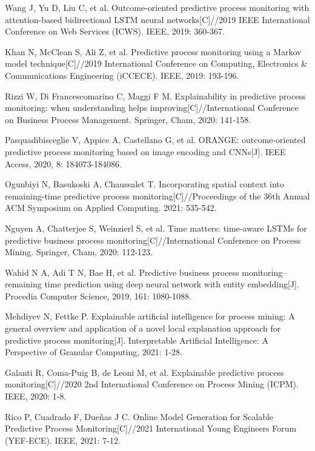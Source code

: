 \documentclass[runningheads]{llncs}
\begin{document}
\begin{thebibliography}{99}
	Wang J, Yu D, Liu C, et al. Outcome-oriented predictive process monitoring with attention-based bidirectional LSTM neural networks[C]//2019 IEEE International Conference on Web Services (ICWS). IEEE, 2019: 360-367.
	
	Khan N, McClean S, Ali Z, et al. Predictive process monitoring using a Markov model technique[C]//2019 International Conference on Computing, Electronics \& Communications Engineering (iCCECE). IEEE, 2019: 193-196.
	
	Rizzi W, Di Francescomarino C, Maggi F M. Explainability in predictive process monitoring: when understanding helps improving[C]//International Conference on Business Process Management. Springer, Cham, 2020: 141-158.
	
	Pasquadibisceglie V, Appice A, Castellano G, et al. ORANGE: outcome-oriented predictive process monitoring based on image encoding and CNNs[J]. IEEE Access, 2020, 8: 184073-184086.
	
	Ogunbiyi N, Basukoski A, Chaussalet T. Incorporating spatial context into remaining-time predictive process monitoring[C]//Proceedings of the 36th Annual ACM Symposium on Applied Computing. 2021: 535-542.
	
	Nguyen A, Chatterjee S, Weinzierl S, et al. Time matters: time-aware LSTMs for predictive business process monitoring[C]//International Conference on Process Mining. Springer, Cham, 2020: 112-123.
	
	Wahid N A, Adi T N, Bae H, et al. Predictive business process monitoring–remaining time prediction using deep neural network with entity embedding[J]. Procedia Computer Science, 2019, 161: 1080-1088.
	
	Mehdiyev N, Fettke P. Explainable artificial intelligence for process mining: A general overview and application of a novel local explanation approach for predictive process monitoring[J]. Interpretable Artificial Intelligence: A Perspective of Granular Computing, 2021: 1-28.
	
	Galanti R, Coma-Puig B, de Leoni M, et al. Explainable predictive process monitoring[C]//2020 2nd International Conference on Process Mining (ICPM). IEEE, 2020: 1-8.
	
	Rico P, Cuadrado F, Dueñas J C. Online Model Generation for Scalable Predictive Process Monitoring[C]//2021 International Young Engineers Forum (YEF-ECE). IEEE, 2021: 7-12.
	

\end{thebibliography}
\end{document}
